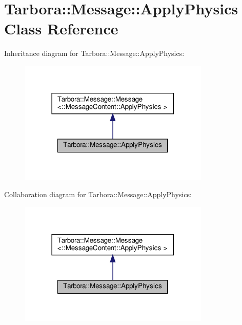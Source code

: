 \hypertarget{classTarbora_1_1Message_1_1ApplyPhysics}{}\section{Tarbora\+:\+:Message\+:\+:Apply\+Physics Class Reference}
\label{classTarbora_1_1Message_1_1ApplyPhysics}


Inheritance diagram for Tarbora\+:\+:Message\+:\+:Apply\+Physics\+:
\nopagebreak
\begin{figure}[H]
\begin{center}
\leavevmode
\includegraphics[width=258pt]{classTarbora_1_1Message_1_1ApplyPhysics__inherit__graph}
\end{center}
\end{figure}


Collaboration diagram for Tarbora\+:\+:Message\+:\+:Apply\+Physics\+:
\nopagebreak
\begin{figure}[H]
\begin{center}
\leavevmode
\includegraphics[width=258pt]{classTarbora_1_1Message_1_1ApplyPhysics__coll__graph}
\end{center}
\end{figure}
